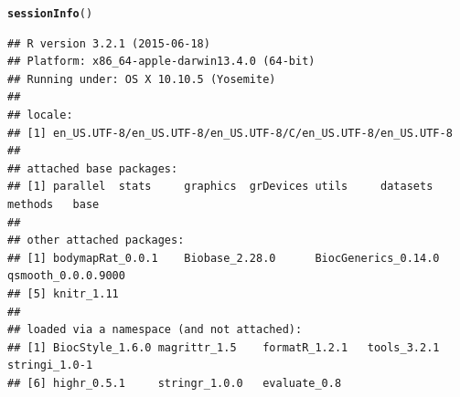 \documentclass{article}\usepackage[]{graphicx}\usepackage[usenames,dvipsnames]{color}
\makeatletter
\newcommand{\hlstd}[1]{\textcolor[rgb]{0.345,0.345,0.345}{#1}}%
\newcommand{\hlkwd}[1]{\textcolor[rgb]{0.737,0.353,0.396}{\textbf{#1}}}%
\newenvironment{kframe}{%
 \def\at@end@of@kframe{}%
 \ifinner\ifhmode%
  \def\at@end@of@kframe{\end{minipage}}%
  \begin{minipage}{\columnwidth}%
 \fi\fi%
 \def\FrameCommand##1{\hskip\@totalleftmargin \hskip-\fboxsep
 \colorbox{shadecolor}{##1}\hskip-\fboxsep
     \hskip-\linewidth \hskip-\@totalleftmargin \hskip\columnwidth}%
 \MakeFramed {\advance\hsize-\width
   \@totalleftmargin\z@ \linewidth\hsize
   \@setminipage}}%
 {\par\unskip\endMakeFramed%
 \at@end@of@kframe}
\newenvironment{knitrout}{}{} %
\makeatother
\begin{document}
\begin{knitrout}
\color{fgcolor}\begin{kframe}
\begin{alltt}
\hlkwd{sessionInfo}\hlstd{()}
\end{alltt}
\begin{verbatim}
## R version 3.2.1 (2015-06-18)
## Platform: x86_64-apple-darwin13.4.0 (64-bit)
## Running under: OS X 10.10.5 (Yosemite)
## 
## locale:
## [1] en_US.UTF-8/en_US.UTF-8/en_US.UTF-8/C/en_US.UTF-8/en_US.UTF-8
## 
## attached base packages:
## [1] parallel  stats     graphics  grDevices utils     datasets  methods   base     
## 
## other attached packages:
## [1] bodymapRat_0.0.1    Biobase_2.28.0      BiocGenerics_0.14.0 qsmooth_0.0.0.9000 
## [5] knitr_1.11         
## 
## loaded via a namespace (and not attached):
## [1] BiocStyle_1.6.0 magrittr_1.5    formatR_1.2.1   tools_3.2.1     stringi_1.0-1  
## [6] highr_0.5.1     stringr_1.0.0   evaluate_0.8
\end{verbatim}
\end{kframe}
\end{knitrout}


\end{document}
